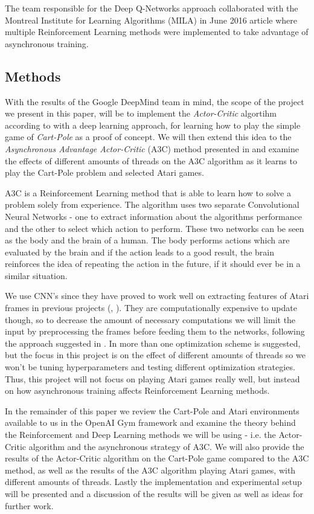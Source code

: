 \documentclass[11pt]{article}
\begin{document}
The team responsible for the Deep Q-Networks approach collaborated with
the Montreal Institute for Learning Algorithms (MILA) in June 2016 article
\cite{a3c} where multiple Reinforcement Learning methods were implemented to
take advantage of asynchronous training.

\subsection{Methods}

With the results of the Google DeepMind team in mind\cite{a3c}, the scope of the project we present in
this paper, will be to implement the \textit{Actor-Critic} algortihm according to \cite{RLbook}
with a deep learning approach, for learning how to play the simple game of \textit{Cart-Pole}\cite{cart_pole}
as a proof of concept.
We will then extend this idea to the \textit{Asynchronous Advantage Actor-Critic} (A3C)
method presented in \cite{a3c} and examine the effects of different amounts of threads
on the A3C algorithm as it learns to play the Cart-Pole problem and selected Atari games.

A3C is a Reinforcement Learning method that is able to learn
how to solve a problem solely from experience.
The algorithm uses two separate Convolutional Neural Networks
 - one to extract information about the algorithms performance 
and the other to select which action to perform.
These two networks can be seen as the body and the brain of a human.
The body performs actions which are evaluated by the brain and if
the action leads to a good result, the brain reinforces the idea
of repeating the action in the future, if it should ever be in a similar
situation.

We use CNN's since they have proved to work well on extracting features
of Atari frames in previous projects (\cite{dqn}, \cite{a3c}).
They are computationally expensive to update though,
so to decrease the amount of necessary computations we will limit
the input by preprocessing the frames before feeding them
to the networks, following the approach suggested in \cite{dqn-nature}.
In \cite{a3c} more than one optimization scheme
is suggested, but the focus in this project is on the effect of
different amounts of threads so we won't be tuning hyperparameters
and testing different optimization strategies.
Thus, this project will not focus on playing Atari games really well,
but instead on how asynchronous training affects 
Reinforcement Learning methods.

In the remainder of this paper we review the 
Cart-Pole and Atari environments available to us in
the OpenAI Gym framework and examine the theory behind the
Reinforcement and Deep Learning methods we will be using
- i.e. the Actor-Critic algorithm and the asynchronous strategy of A3C.
We will also provide the results of the Actor-Critic algorithm
on the Cart-Pole game compared to the A3C method, as well as the
results of the A3C algorithm playing Atari games, with different 
amounts of threads. 
Lastly the implementation and experimental setup will be presented and
a discussion of the results will be given as well as ideas for further
work.
\end{document}
